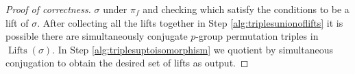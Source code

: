 \documentclass{dcthesis}
\newcommand{\PP}{\mathbb P}
\newcommand{\mm}[1]{{\color{blue} \sf MM: [#1]}}
\newcommand{\wt}[1]{\widetilde{#1}}
\DeclareMathOperator{\Lifts}{Lifts}
\numberwithin{equation}{section}
\theoremstyle{definition}
\theoremstyle{remark}
\begin{document}
{{{\begin{proof}[Proof of correctness]
      $\sigma$ under $\pi_f$
      and checking which satisfy
      the conditions to be a lift of
      $\sigma$.
      After collecting all the lifts together
      in Step
      \ref{alg:triplesunionoflifts}
      it is possible there are
      simultaneously conjugate
      $p$-group permutation triples
      in $\Lifts(\sigma)$.
      In Step
      \ref{alg:triplesuptoisomorphism}
      we quotient by
      simultaneous conjugation
      to obtain the desired
      set of lifts as output.

\end{proof}}}}
\end{document}

